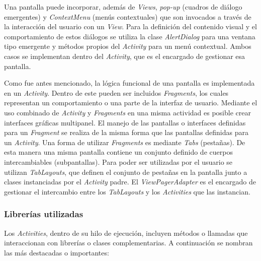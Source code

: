     \par Una pantalla puede incorporar, además de \textit{Views}, \textit{pop-up} (cuadros de diálogo emergentes) y  \textit{ContextMenu} (menús contextuales) que son invocados a través de la interacción del usuario con un \textit{View}. Para la definición del contenido visual y el comportamiento de estos diálogos se utiliza la clase \textit{AlertDialog} para una ventana tipo emergente y métodos propios del \textit{Activity} para un menú contextual. Ambos casos se implementan dentro del \textit{Activity}, que es el encargado de gestionar esa pantalla.
        
    \par Como fue antes mencionado, la lógica funcional de una pantalla es implementada en un \textit{Activity}. Dentro de este pueden ser incluidos \textit{Fragments}, los cuales representan un comportamiento o una parte de la interfaz de usuario. Mediante el uso combinado de \textit{Activity} y \textit{Fragments} en una misma actividad es posible crear interfaces gráficas multipanel. El manejo de las pantallas o interfaces definidas para un \textit{Fragment} se realiza de la misma forma que las pantallas definidas para un \textit{Activity}. Una forma de utilizar \textit{Fragments} es mediante \textit{Tabs} (pestañas). De esta manera una misma pantalla contiene un conjunto definido de cuerpos intercambiables (subpantallas). Para poder ser utilizadas por el usuario se utilizan \textit{TabLayouts}, que definen el conjunto de pestañas en la pantalla junto a clases instanciadas por el \textit{Activity} padre. El \textit{ViewPagerAdapter} es el encargado de gestionar el intercambio entre los \textit{TabLayouts} y los \textit{Activities} que las instancian.
    
    \subsubsection{Librerías utilizadas}
     \par Los \textit{Activities}, dentro de su hilo de ejecución, incluyen métodos o llamadas que interaccionan con librerías o clases complementarias. A continuación se nombran las más destacadas o importantes: 
     
